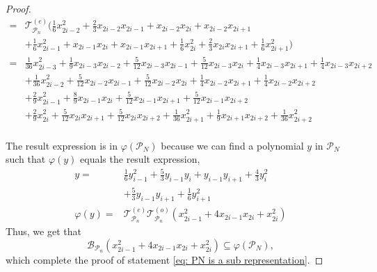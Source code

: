 \documentclass[journal=jctcce,a4paper,manuscript=article]{achemso}
\newcommand{\Tcal}{\mathcal{T}}
\begin{document}
\begin{proof}
\begin{equation}
\begin{aligned}
      = & \Tcal^{(e)}_{\mathcal{P}_n}(\frac{1}{6}x_{2i-2}^2 + \frac{2}{3} x_{2i-2}x_{2i-1} + x_{2i-2}x_{2i}+x_{2i-2}x_{2i+1}                                                               \\
        & +\frac{1}{6} x_{2i-1}^2 + x_{2i-1}x_{2i} + x_{2i-1}x_{2i+1} +\frac{1}{6} x_{2i}^2 + \frac{2}{3} x_{2i}x_{2i+1} + \frac{1}{6}x_{2i+1}^2  )                                        \\
      = & \frac{1}{36}x_{2i-3}^2 + \frac{1}{9} x_{2i-3}x_{2i-2} +\frac{5}{12} x_{2i-3}x_{2i-1}+ \frac{5}{12} x_{2i-3}x_{2i}  + \frac{1}{4} x_{2i-3}x_{2i+1} + \frac{1}{4} x_{2i-3}x_{2i+2} \\
        & + \frac{1}{36}x_{2i-2}^2 + \frac{5}{12} x_{2i-2}x_{2i-1}+ \frac{5}{12} x_{2i-2}x_{2i}  + \frac{1}{4} x_{2i-2}x_{2i+1} + \frac{1}{4} x_{2i-2}x_{2i+2}                             \\
        & + \frac{2}{9}x_{2i-1}^2 + \frac{8}{9} x_{2i-1}x_{2i} + \frac{5}{12} x_{2i-1}x_{2i+1} + \frac{5}{12} x_{2i-1}x_{2i+2}                                                             \\
        & + \frac{2}{9}x_{2i}^2 + \frac{5}{12} x_{2i}x_{2i+1} + \frac{5}{12} x_{2i}x_{2i+2} + \frac{1}{36}x_{2i+1}^2  + \frac{1}{9} x_{2i+1}x_{2i+2}+ \frac{1}{36}x_{2i+2}^2               \\
    \end{aligned}
  \end{equation}

  The result expression is in $\varphi(\mathcal{P}_N)$ because we can find a
  polynomial $y$ in $\mathcal{P}_N$ such that $\varphi(y)$ equals the result
  expression,
  \begin{align}
    y =          & \frac{1}{6} y_{i-1}^2 + \frac{5}{3} y_{i-1}y_{i} + y_{i-1}y_{i+1} + \frac{4}{3} y_{i}^2 \nonumber \\
                 & + \frac{5}{3} y_{i-1}y_{i+1}  + \frac{1}{6} y_{i+1}^2                                             \\
    \varphi(y) = & \Tcal^{(e)}_{\mathcal{P}_n}\Tcal^{(o)}_{\mathcal{P}_n} ( x_{2i-1}^2+4 x_{2i-1} x_{2i}+x_{2i}^2)
  \end{align}
  Thus, we get that
  \begin{equation}
    \mathcal{B}_{\mathcal{P}_n} ( x_{2i-1}^2+4 x_{2i-1} x_{2i}+x_{2i}^2) \subseteq \varphi(\mathcal{P}_N),
  \end{equation}
  which complete the proof of statement \ref{eq: PN is a sub representation}.


\end{proof}
\end{document}
